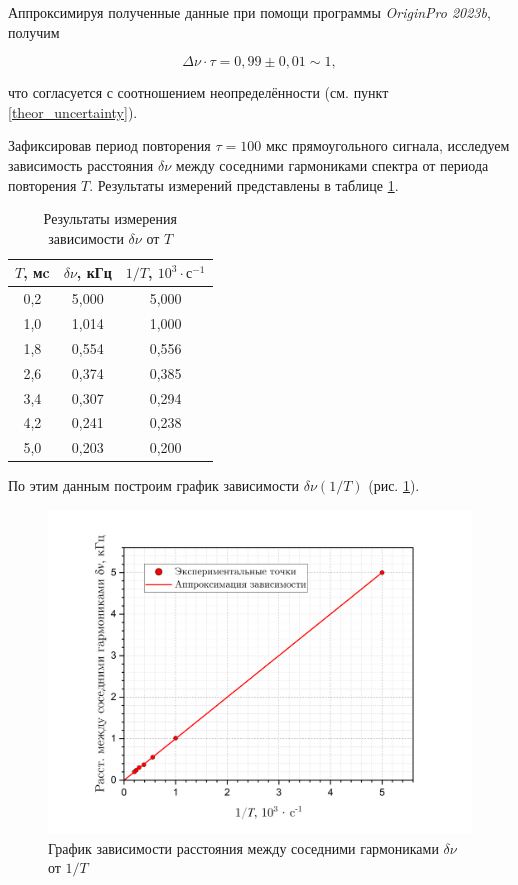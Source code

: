 \documentclass[a4paper, 12pt]{article}
\begin{document}
    Аппроксимируя полученные данные при помощи программы \textit{OriginPro 2023b}, получим

    $$
    \boxed{\Delta \nu \cdot \tau = 0,99 \pm 0,01 \sim 1}, 
    $$

    что согласуется с соотношением неопределённости (см. пункт \ref{theor_uncertainty}).

    Зафиксировав период повторения $\tau = 100$ мкс прямоугольного сигнала, исследуем зависимость расстояния $\delta \nu$ между соседними гармониками спектра от периода повторения $T$. Результаты измерений представлены в таблице \ref{nu_T}.

    \begin{table}[H]
        \centering
        \begin{tabular}{|c|c|c|}
        \hline
        $T$, мc & $\delta \nu$, кГц & $1/T$, $10^{3} \cdot \text{с}^{-1}$ \\ \hline
        0,2 & 5,000 & 5,000 \\ \hline
        1,0 & 1,014 & 1,000 \\ \hline
        1,8 & 0,554 & 0,556 \\ \hline
        2,6 & 0,374 & 0,385 \\ \hline
        3,4 & 0,307 & 0,294 \\ \hline
        4,2 & 0,241 & 0,238 \\ \hline
        5,0 & 0,203 & 0,200 \\ \hline
        \end{tabular}
        \caption{Результаты измерения зависимости $\delta \nu$ от $T$}
        \label{nu_T}
    \end{table}

    По этим данным построим график зависимости $\delta \nu \left( 1/T \right)$ (рис. \ref{graph:nu_T}).

    \begin{figure}[H]
        \centering
        \includegraphics[width = 14 cm]{images/graph_nu_T.png}
        \caption{График зависимости расстояния между соседними гармониками $\delta \nu$ от $1/T$}
        \label{graph:nu_T}
    \end{figure}
\end{document}
